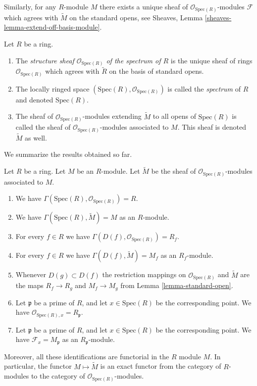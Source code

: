 \medskip\noindent
Similarly, for any $R$-module $M$ there exists
a unique sheaf of $\mathcal{O}_{\text{Spec}(R)}$-modules
$\mathcal{F}$ which agrees with $\widetilde M$ on the
standard opens, see
Sheaves, Lemma \ref{sheaves-lemma-extend-off-basis-module}.

\begin{definition}
\label{definition-structure-sheaf}
Let $R$ be a ring.
\begin{enumerate}
\item The {\it structure sheaf $\mathcal{O}_{\text{Spec}(R)}$ of the
spectrum of $R$} is the unique sheaf of rings $\mathcal{O}_{\text{Spec}(R)}$
which agrees with $\widetilde R$ on the basis of standard opens.
\item The locally ringed space
$(\text{Spec}(R), \mathcal{O}_{\text{Spec}(R)})$ is called
the {\it spectrum} of $R$ and denoted $\text{Spec}(R)$.
\item The sheaf of $\mathcal{O}_{\text{Spec}(R)}$-modules
extending $\widetilde M$ to all opens of $\text{Spec}(R)$
is called the sheaf of $\mathcal{O}_{\text{Spec}(R)}$-modules
associated to $M$. This sheaf is denoted $\widetilde M$ as
well.
\end{enumerate}
\end{definition}

\noindent
We summarize the results obtained so far.

\begin{lemma}
\label{lemma-spec-sheaves}
Let $R$ be a ring. Let $M$ be an $R$-module. Let $\widetilde M$
be the sheaf of $\mathcal{O}_{\text{Spec}(R)}$-modules
associated to $M$.
\begin{enumerate}
\item We have $\Gamma(\text{Spec}(R), \mathcal{O}_{\text{Spec}(R)}) = R$.
\item We have $\Gamma(\text{Spec}(R), \widetilde M) = M$ as an $R$-module.
\item For every $f \in R$ we have
$\Gamma(D(f), \mathcal{O}_{\text{Spec}(R)}) = R_f$.
\item For every $f\in R$ we have $\Gamma(D(f), \widetilde M) = M_f$
as an $R_f$-module.
\item Whenever $D(g) \subset D(f)$ the restriction mappings
on $\mathcal{O}_{\text{Spec}(R)}$ and $\widetilde M$
are the maps
$R_f \to R_g$ and $M_f \to M_g$ from Lemma
\ref{lemma-standard-open}.
\item Let $\mathfrak p$ be a prime of $R$, and let $x \in \text{Spec}(R)$
be the corresponding point. We have
$\mathcal{O}_{\text{Spec}(R), x} = R_{\mathfrak p}$.
\item Let $\mathfrak p$ be a prime of $R$, and let $x \in \text{Spec}(R)$
be the corresponding point. We have $\mathcal{F}_x = M_{\mathfrak p}$
as an $R_{\mathfrak p}$-module.
\end{enumerate}
Moreover, all these identifications are functorial in the $R$
module $M$. In particular, the functor $M \mapsto \widetilde M$
is an exact functor from the category of $R$-modules
to the category of $\mathcal{O}_{\text{Spec}(R)}$-modules.
\end{lemma}

